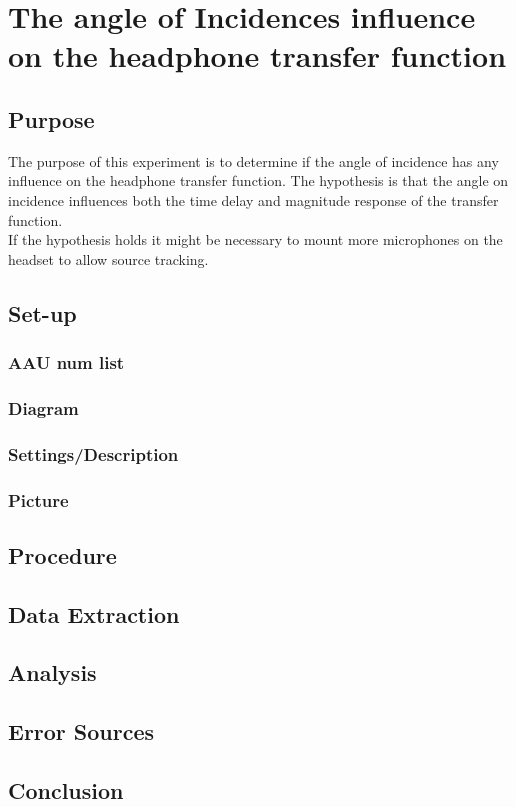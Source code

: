 
\section{The angle of Incidences influence on the headphone transfer function}

\subsection{Purpose}
The purpose of this experiment is to determine if the angle of incidence has any influence on the headphone transfer function. The hypothesis is that the angle on incidence influences both the time delay and magnitude response of the transfer function. \\ 
If the hypothesis holds it might be necessary to mount more microphones on the headset to allow source tracking. 

\subsection{Set-up}
\subsubsection{AAU num list}
\subsubsection{Diagram}
\subsubsection{Settings/Description}
\subsubsection{Picture}

\subsection{Procedure}

\subsection{Data Extraction}

\subsection{Analysis}

\subsection{Error Sources}

\subsection{Conclusion}